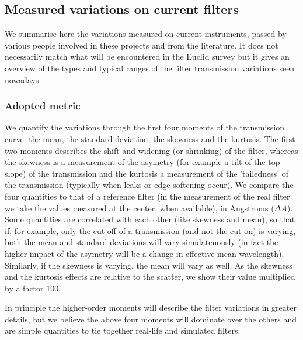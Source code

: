 \documentclass[11pt]{article}
\begin{document}
\subsection{Measured variations on current
filters}\label{measured-variations-on-current-filters}

We summarise here the variations measured on current instruments, passed
by various people involved in these projects and from the literature. It
does not necessarily match what will be encountered in the Euclid survey
but it gives an overview of the types and typical ranges of the filter
transmission variations seen nowadays.

\subsubsection{Adopted metric}\label{adopted-metric}

We quantify the variations through the first four moments of the
transmission curve: the mean, the standard deviation, the skewness and
the kurtosis. The first two moments describes the shift and widening (or
shrinking) of the filter, whereas the skewness is a measurement of the
asymetry (for example a tilt of the top slope) of the transmission and
the kurtosis a measurement of the 'tailedness' of the transmission
(typically when leaks or edge softening occur). We compare the four
quantities to that of a reference filter (in the measurement of the real
filter we take the values measured at the center, when available), in
Angstroms (\(\Delta A\)). Some quantities are correlated with each other
(like skewness and mean), so that if, for example, only the cut-off of a
transmission (and not the cut-on) is varying, both the mean and standard
deviations will vary simulatenously (in fact the higher impact of the
asymetry will be a change in effective mean wavelength). Similarly, if
the skewness is varying, the mean will vary as well. As the skewness and
the kurtosis effects are relative to the scatter, we show their value
multiplied by a factor 100.

In principle the higher-order moments will describe the filter
variations in greater details, but we believe the above four moments
will dominate over the others and are simple quantities to tie together
real-life and simulated filters.
\end{document}
